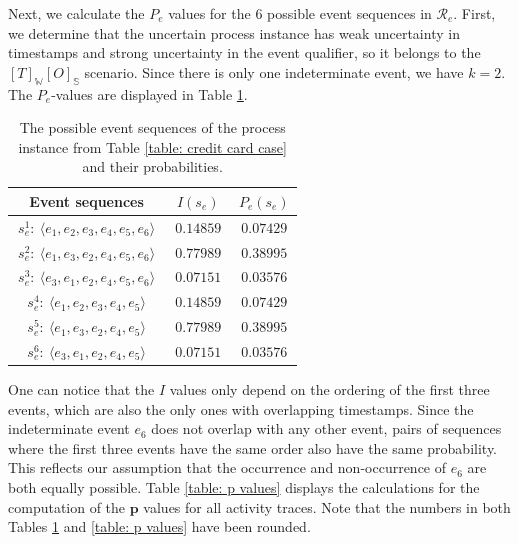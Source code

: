Next, we calculate the $P_e$ values for the 6 possible event sequences in $\mathcal{R}_e$.
First, we determine that the uncertain process instance has weak uncertainty in timestamps and strong uncertainty in the event qualifier, so it belongs to the $[T]_{\mathbb{W}}[O]_{\mathbb{S}}$ scenario.
Since there is only one indeterminate event, we have $k = 2$.
The $P_e$-values are displayed in Table \ref{table: Pe values}.

%
%
%
\begin{table}[h]
\caption{The possible event sequences of the process instance from Table \ref{table: credit card case} and their probabilities.}
	\centering
	\begin{tabular}{ccc}
		\textbf{Event sequences} & \textbf{$I(s_e)$} & \textbf{$P_e(s_e)$}
		\\ \hline
	\multicolumn{1}{|c|}{$~ s_e^1:~\langle e_1,e_2,e_3,e_4,e_5,e_6\rangle ~$} & 
	\multicolumn{1}{|c|}{$~ 0.14859 ~$} &
	\multicolumn{1}{|c|}{$~ 0.07429 ~$} 
\\ \hline
	\multicolumn{1}{|c|}{$s_e^2:~\langle e_1,e_3,e_2,e_4,e_5,e_6\rangle$} & 
	\multicolumn{1}{|c|}{$0.77989$} &
	\multicolumn{1}{|c|}{$0.38995$} 
\\ \hline
	\multicolumn{1}{|c|}{$s_e^3:~\langle e_3,e_1,e_2,e_4,e_5,e_6\rangle$} & 
	\multicolumn{1}{|c|}{$0.07151$} &
	\multicolumn{1}{|c|}{$0.03576$} 
\\ \hline
	\multicolumn{1}{|c|}{$s_e^4:~\langle e_1,e_2,e_3,e_4,e_5\rangle$} & 
	\multicolumn{1}{|c|}{$0.14859$} &
	\multicolumn{1}{|c|}{$0.07429$} 
\\ \hline
	\multicolumn{1}{|c|}{$s_e^5:~\langle e_1,e_3,e_2,e_4,e_5\rangle$} & 
	\multicolumn{1}{|c|}{$0.77989$} &
	\multicolumn{1}{|c|}{$0.38995$} 
\\ \hline
	\multicolumn{1}{|c|}{$s_e^6:~\langle e_3,e_1,e_2,e_4,e_5\rangle$} & 
	\multicolumn{1}{|c|}{$0.07151$} &
	\multicolumn{1}{|c|}{$0.03576$} 
\\ \hline
	\end{tabular}
	\label{table: Pe values}
\end{table} 
%
%
%
One can notice that the $I$ values only depend on the ordering of the first three events, which are also the only ones with overlapping timestamps.
Since the indeterminate event $e_6$ does not overlap with any other event, pairs of sequences where the first three events have the same order also have the same probability.
This reflects our assumption that the occurrence and non-occurrence of $e_6$ are both equally possible.
Table \ref{table: p values} displays the calculations for the computation of the $\textbf{p}$ values for all activity traces.
Note that the numbers in both Tables \ref{table: Pe values} and \ref{table: p values} have been rounded.

